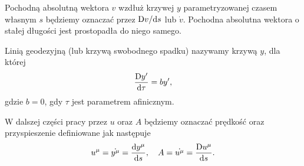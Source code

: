 Pochodną absolutną wektora $v$ wzdłuż krzywej $y$
parametryzowanej czasem własnym $s$
będziemy oznaczać przez $\text{D} v/\text{d} s$ lub $\dot{v}$. 
Pochodna absolutna wektora o stałej długości 
jest prostopadła do niego samego.
\begin{definition}
Linią geodezyjną (lub krzywą swobodnego spadku) nazywamy 
krzywą $y$, dla której
\begin{align*}
\frac{\text{D} y'}{\text{d} \tau } = b y',
\end{align*} 
gdzie $b=0$, gdy $\tau$ jest parametrem afinicznym.
\end{definition}
W dalszej części pracy przez $u$ oraz $A$ będziemy oznaczać
prędkość oraz przyspieszenie definiowane jak następuje
\begin{align*}
u^\mu = \dot{y^\mu} = \frac{\text{d} y^\mu}{\text{d} s}, 
\quad A = \dot{u^\mu} =  \frac{\text{D} u^\mu}{\text{d} s}.
\end{align*}

